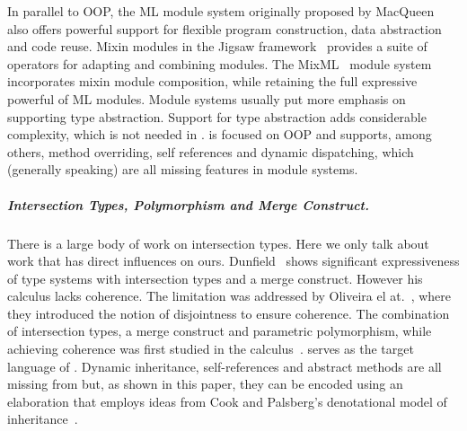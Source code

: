 In parallel to OOP, the ML module system originally proposed by
MacQueen~\cite{MacQueen_1984} also offers powerful support for flexible program
construction, data abstraction and code reuse. Mixin modules in the
Jigsaw framework~\cite{Bracha92modularitymeets} provides a suite of operators
for adapting and combining modules. The MixML~\cite{Rossberg_2013} module
system incorporates mixin module composition, while retaining the full
expressive powerful of ML modules. Module systems usually put more emphasis on
supporting type abstraction. Support for type abstraction
adds considerable complexity, which is not needed in \name. \name is focused on
OOP and supports, among others, method overriding, self references and dynamic
dispatching, which (generally speaking) are all missing features in module systems.



\subparagraph{Intersection Types, Polymorphism and Merge Construct.} There
is a large body of work on intersection types. Here we only talk about work that
has direct influences on ours. Dunfield~\cite{dunfield2014elaborating} shows
significant expressiveness of type systems with intersection types and a merge
construct. However his calculus lacks coherence. The limitation was addressed by
Oliveira el at.~\cite{oliveira2016disjoint}, where they introduced the notion of
disjointness to ensure coherence. The combination of intersection types, a merge
construct and parametric polymorphism, while achieving coherence was first
studied in the \bname calculus~\cite{alpuimdisjoint}.
\bname serves as the target language
of \name. Dynamic inheritance, self-references and abstract methods
are all missing from \bname but, as shown in this paper, they can be
encoded using an elaboration that employs ideas from Cook and
Palsberg's denotational model of inheritance~\cite{cook1989denotational}.


